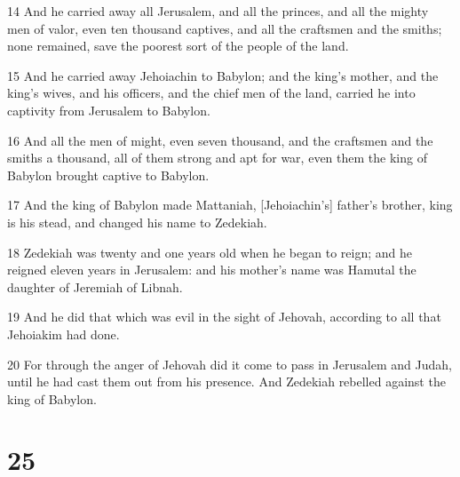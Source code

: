 \par 14 And he carried away all Jerusalem, and all the princes, and all the mighty men of valor, even ten thousand captives, and all the craftsmen and the smiths; none remained, save the poorest sort of the people of the land.
\par 15 And he carried away Jehoiachin to Babylon; and the king's mother, and the king's wives, and his officers, and the chief men of the land, carried he into captivity from Jerusalem to Babylon.
\par 16 And all the men of might, even seven thousand, and the craftsmen and the smiths a thousand, all of them strong and apt for war, even them the king of Babylon brought captive to Babylon.
\par 17 And the king of Babylon made Mattaniah, [Jehoiachin's] father's brother, king is his stead, and changed his name to Zedekiah.
\par 18 Zedekiah was twenty and one years old when he began to reign; and he reigned eleven years in Jerusalem: and his mother's name was Hamutal the daughter of Jeremiah of Libnah.
\par 19 And he did that which was evil in the sight of Jehovah, according to all that Jehoiakim had done.
\par 20 For through the anger of Jehovah did it come to pass in Jerusalem and Judah, until he had cast them out from his presence. And Zedekiah rebelled against the king of Babylon.

\chapter{25}

